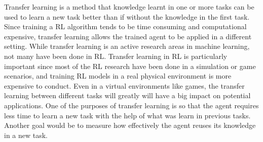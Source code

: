 \documentclass[11pt,twoside]{report}
\theoremstyle{plain}
\theoremstyle{definition}
\begin{document}
Transfer learning is a method that knowledge learnt in one or more tasks can be used to learn a new task better than if without the knowledge in the first task. Since training a RL algorithm tends to be time consuming and computational expensive, transfer learning allows the trained agent to be applied in a different setting.
While transfer learning is an active research areas in machine learning, not many have been done in RL. Transfer learning in RL is particularly important since most of the RL research have been done in a simulation or game scenarios, and training RL models in a real physical environment is more expensive to conduct. Even in a virtual environments like games, the transfer learning between different tasks will greatly will have a big impact on potential applications.
One of the purposes of transfer learning is so that the agent requires less time to learn a new task with the help of what was learn in previous tasks. Another goal would be to measure how effectively the agent reuses its knowledge in a new task.

\end{document}
